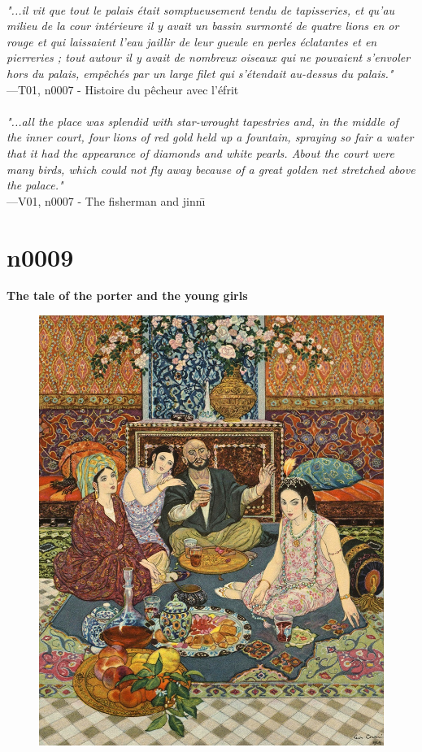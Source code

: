 \documentclass[../Carre_nights.tex]{subfiles}
\begin{document}
\textit{\\
"...il vit que tout le palais était somptueusement tendu de tapisseries, et qu’au milieu de la cour intérieure il y avait un bassin surmonté de quatre lions en or rouge et qui laissaient l’eau jaillir de leur gueule en perles éclatantes et en pierreries ; tout autour il y avait de nombreux oiseaux qui ne pouvaient s’envoler hors du palais, empêchés par un large filet qui s’étendait au-dessus du palais."} \\
—T01, n0007 - Histoire du pêcheur avec l'éfrit \\~\\
\textit{"...all the place was splendid with star-wrought tapestries and, in the middle of the inner court, four lions of red gold held up a fountain, spraying so fair a water that it had the appearance of diamonds and white pearls. About the court were many birds, which could not fly away because of a great golden net stretched above the palace."} \\
—V01, n0007 - The fisherman and jinn\={\i}

\newpage

\section{n0009}
\textbf{\Large{The tale of the porter and the young girls}} \\

\begin{figure}[ht]
\centering
\includegraphics[height=\figsize]{illustrations/volume_1/T01, n0009 - Histoire du portefaix avec les jeunes filles.jpg}
\end{figure}
\end{document}
